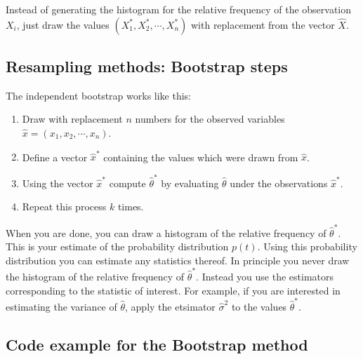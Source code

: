 \documentclass[%
oneside,                 %
final,                   %
10pt]{article}
\begin{document}
Instead of generating the histogram for the relative
frequency of the observation $X_i$, just draw the values
$(X_1^*,X_2^*,\cdots,X_n^*)$ with replacement from the vector
$\hat{X}$. 

\subsection*{Resampling methods: Bootstrap steps}

The independent bootstrap works like this: 

\begin{enumerate}
\item Draw with replacement $n$ numbers for the observed variables $\hat{x} = (x_1,x_2,\cdots,x_n)$. 

\item Define a vector $\hat{x}^*$ containing the values which were drawn from $\hat{x}$. 

\item Using the vector $\hat{x}^*$ compute $\widehat{\theta}^*$ by evaluating $\widehat \theta$ under the observations $\hat{x}^*$. 

\item Repeat this process $k$ times. 
\end{enumerate}

\noindent
When you are done, you can draw a histogram of the relative frequency of $\widehat \theta^*$. This is your estimate of the probability distribution $p(t)$. Using this probability distribution you can estimate any statistics thereof. In principle you never draw the histogram of the relative frequency of $\widehat{\theta}^*$. Instead you use the estimators corresponding to the statistic of interest. For example, if you are interested in estimating the variance of $\widehat \theta$, apply the etsimator $\widehat \sigma^2$ to the values $\widehat \theta ^*$.

\subsection*{Code example for the Bootstrap method}
\end{document}
